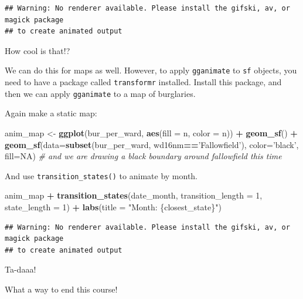 \documentclass[]{book}
\newenvironment{Shaded}{\begin{snugshade}}{\end{snugshade}}
\newcommand{\CommentTok}[1]{\textcolor[rgb]{0.56,0.35,0.01}{\textit{#1}}}
\newcommand{\DataTypeTok}[1]{\textcolor[rgb]{0.13,0.29,0.53}{#1}}
\newcommand{\DecValTok}[1]{\textcolor[rgb]{0.00,0.00,0.81}{#1}}
\newcommand{\KeywordTok}[1]{\textcolor[rgb]{0.13,0.29,0.53}{\textbf{#1}}}
\newcommand{\NormalTok}[1]{#1}
\newcommand{\OperatorTok}[1]{\textcolor[rgb]{0.81,0.36,0.00}{\textbf{#1}}}
\newcommand{\OtherTok}[1]{\textcolor[rgb]{0.56,0.35,0.01}{#1}}
\newcommand{\StringTok}[1]{\textcolor[rgb]{0.31,0.60,0.02}{#1}}
\begin{document}
\begin{verbatim}
## Warning: No renderer available. Please install the gifski, av, or magick package
## to create animated output
\end{verbatim}

How cool is that!?

We can do this for maps as well. However, to apply \texttt{gganimate} to \texttt{sf} objects, you need to have a package called \texttt{transformr} installed. Install this package, and then we can apply \texttt{gganimate} to a map of burglaries.

Again make a static map:

\begin{Shaded}
\begin{Highlighting}[]
\NormalTok{anim_map <-}\StringTok{ }\KeywordTok{ggplot}\NormalTok{(bur_per_ward, }\KeywordTok{aes}\NormalTok{(}\DataTypeTok{fill =}\NormalTok{ n, }\DataTypeTok{color =}\NormalTok{ n)) }\OperatorTok{+}\StringTok{ }
\StringTok{  }\KeywordTok{geom_sf}\NormalTok{() }\OperatorTok{+}
\StringTok{  }\KeywordTok{geom_sf}\NormalTok{(}\DataTypeTok{data=}\KeywordTok{subset}\NormalTok{(bur_per_ward, wd16nm}\OperatorTok{==}\StringTok{'Fallowfield'}\NormalTok{), }\DataTypeTok{color=}\StringTok{'black'}\NormalTok{, }\DataTypeTok{fill=}\OtherTok{NA}\NormalTok{) }\CommentTok{# and we are drawing a black boundary around fallowfield this time}
\end{Highlighting}
\end{Shaded}

And use \texttt{transition\_states()} to animate by month.

\begin{Shaded}
\begin{Highlighting}[]
\NormalTok{anim_map }\OperatorTok{+}\StringTok{ }\KeywordTok{transition_states}\NormalTok{(date_month, }\DataTypeTok{transition_length =} \DecValTok{1}\NormalTok{, }\DataTypeTok{state_length =} \DecValTok{1}\NormalTok{) }\OperatorTok{+}
\StringTok{  }\KeywordTok{labs}\NormalTok{(}\DataTypeTok{title =} \StringTok{"Month: \{closest_state\}"}\NormalTok{)}
\end{Highlighting}
\end{Shaded}

\begin{verbatim}
## Warning: No renderer available. Please install the gifski, av, or magick package
## to create animated output
\end{verbatim}

Ta-daaa!

What a way to end this course!


\end{document}
